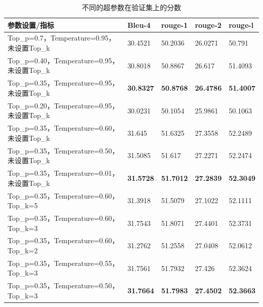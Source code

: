 \documentclass[
    decl-page,  %
    ,fontset = win, %
  ]{njuthesis}
\begin{document}
\begin{table}[]
\renewcommand\arraystretch{1.5} %
\caption{不同的超参数在验证集上的分数}
\label{scorecanshu}
\begin{tabular}{|l|l|l|l|l|}
\hline
\textbf{参数设置/指标}                       & \textbf{Bleu-4} & \textbf{rouge-1} & \textbf{rouge-2}   & \textbf{rouge-l} \\ \hline
Top\_p=0.7，Temperature=0.95，未设置Top\_k  & 30.4521         & 50.2036          & 26.0271            & 50.791           \\ \hline
Top\_p=0.40，Temperature=0.95，未设置Top\_k & 30.8018         & 50.8867          & 26.617             & 51.4093          \\ \hline
Top\_p=0.35，Temperature=0.95，未设置Top\_k & \textbf{30.8327}         & \textbf{50.8768}          & \textbf{26.4786}            & \textbf{51.4007}          \\ \hline
Top\_p=0.20，Temperature=0.95，未设置Top\_k & 30.0231         & 50.1054          & 25.9861            & 50.1063          \\ \hline
Top\_p=0.35，Temperature=0.60，未设置Top\_k & 31.645          & 51.6325          & 27.3558            & 52.2489          \\ \hline
Top\_p=0.35，Temperature=0.50，未设置Top\_k & 31.5085         & 51.617           & 27.2271            & 52.2474          \\ \hline
Top\_p=0.35，Temperature=0.01，未设置Top\_k & \textbf{31.5728}      & \textbf{51.7012}       & \textbf{27.2839} & \textbf{52.3049}      \\ \hline
Top\_p=0.35，Temperature=0.60，Top\_k=5  & 31.3918         & 51.5079          & 27.1022            & 52.1111          \\ \hline
Top\_p=0.35，Temperature=0.60，Top\_k=3  & 31.7543         & 51.8071          & 27.4401            & 52.3731          \\ \hline
Top\_p=0.35，Temperature=0.60，Top\_k=2  & 31.2762         & 51.2558          & 27.0408            & 52.0612          \\ \hline
Top\_p=0.35，Temperature=0.55，Top\_k=3  & 31.7561         & 51.7932          & 27.426             & 52.3624          \\ \hline
Top\_p=0.35，Temperature=0.50，Top\_k=3  & \textbf{31.7664}         & \textbf{51.7983}          & \textbf{27.4502}            & \textbf{52.3663}          \\ \hline
\end{tabular}
\end{table}
\end{document}
